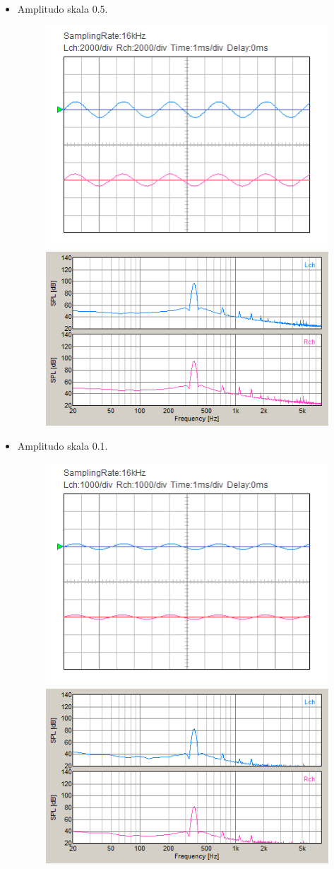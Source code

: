 \documentclass[12pt,]{article}
\begin{document}
\begin{itemize}
\begin{itemize}
\begin{itemize}
			\item Amplitudo skala 0.5.
			\begin{figure}[H]
				\centering
				\includegraphics[width=0.45\linewidth]{result/day_3/400_Hz/osi_tone05}
				\includegraphics[width=0.45\linewidth]{result/day_3/400_Hz/fft_tone05}
			\end{figure}
		
			\item Amplitudo skala 0.1.
			\begin{figure}[H]
				\centering
				\includegraphics[width=0.45\linewidth]{result/day_3/400_Hz/osi_tone01}
				\includegraphics[width=0.45\linewidth]{result/day_3/400_Hz/fft_tone01}
			\end{figure}
		

\end{itemize}
\end{itemize}
\end{itemize}
\end{document}

